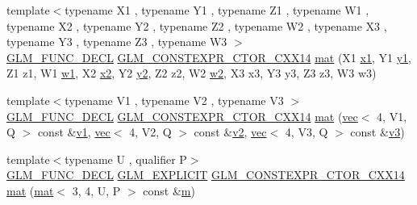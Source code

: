 \begin{DoxyCompactItemize}
{\footnotesize template$<$typename X1 , typename Y1 , typename Z1 , typename W1 , typename X2 , typename Y2 , typename Z2 , typename W2 , typename X3 , typename Y3 , typename Z3 , typename W3 $>$ }\\\mbox{\hyperlink{setup_8hpp_ab2d052de21a70539923e9bcbf6e83a51}{G\+L\+M\+\_\+\+F\+U\+N\+C\+\_\+\+D\+E\+CL}} \mbox{\hyperlink{setup_8hpp_a0900f9145e68bf6061b6f5e7be3fa751}{G\+L\+M\+\_\+\+C\+O\+N\+S\+T\+E\+X\+P\+R\+\_\+\+C\+T\+O\+R\+\_\+\+C\+X\+X14}} \mbox{\hyperlink{structglm_1_1mat_3_013_00_014_00_01_t_00_01_q_01_4_a789aeb16a52b123e18e519b41ecfc4f3}{mat}} (X1 \mbox{\hyperlink{_s_d_l__opengl__glext_8h_a49825216c96caaeb09237b36651181c5}{x1}}, Y1 \mbox{\hyperlink{_s_d_l__opengl__glext_8h_a3af6c78fcdfccea028a5878bc747ef39}{y1}}, Z1 z1, W1 \mbox{\hyperlink{_s_d_l__opengl__glext_8h_ab5b747bf5adb1f9134337c30b9a4ce84}{w1}}, X2 \mbox{\hyperlink{_s_d_l__opengl__glext_8h_a7b907a03236685c534d89d604cff23c8}{x2}}, Y2 \mbox{\hyperlink{_s_d_l__opengl__glext_8h_a2be1135ed68e8d80fa9e130c7814f8c2}{y2}}, Z2 z2, W2 \mbox{\hyperlink{_s_d_l__opengl__glext_8h_a1ca5aca787be24213d9591fdf074b094}{w2}}, X3 x3, Y3 y3, Z3 z3, W3 w3)
\item 
{\footnotesize template$<$typename V1 , typename V2 , typename V3 $>$ }\\\mbox{\hyperlink{setup_8hpp_ab2d052de21a70539923e9bcbf6e83a51}{G\+L\+M\+\_\+\+F\+U\+N\+C\+\_\+\+D\+E\+CL}} \mbox{\hyperlink{setup_8hpp_a0900f9145e68bf6061b6f5e7be3fa751}{G\+L\+M\+\_\+\+C\+O\+N\+S\+T\+E\+X\+P\+R\+\_\+\+C\+T\+O\+R\+\_\+\+C\+X\+X14}} \mbox{\hyperlink{structglm_1_1mat_3_013_00_014_00_01_t_00_01_q_01_4_a135092220b6453ee15896a05b01fcbd6}{mat}} (\mbox{\hyperlink{structglm_1_1vec}{vec}}$<$ 4, V1, Q $>$ const \&\mbox{\hyperlink{_s_d_l__opengl__glext_8h_a435c176a02c061b43e19bdf7c86cceae}{v1}}, \mbox{\hyperlink{structglm_1_1vec}{vec}}$<$ 4, V2, Q $>$ const \&\mbox{\hyperlink{_s_d_l__opengl__glext_8h_a0928f6d0f0f794ba000a21dfae422136}{v2}}, \mbox{\hyperlink{structglm_1_1vec}{vec}}$<$ 4, V3, Q $>$ const \&\mbox{\hyperlink{_s_d_l__opengl__glext_8h_acc806b31cbf466ceba6555983d8b814d}{v3}})
\item 
{\footnotesize template$<$typename U , qualifier P$>$ }\\\mbox{\hyperlink{setup_8hpp_ab2d052de21a70539923e9bcbf6e83a51}{G\+L\+M\+\_\+\+F\+U\+N\+C\+\_\+\+D\+E\+CL}} \mbox{\hyperlink{setup_8hpp_a6c74f5a5e7b134ab69023ff9a30d4d5d}{G\+L\+M\+\_\+\+E\+X\+P\+L\+I\+C\+IT}} \mbox{\hyperlink{setup_8hpp_a0900f9145e68bf6061b6f5e7be3fa751}{G\+L\+M\+\_\+\+C\+O\+N\+S\+T\+E\+X\+P\+R\+\_\+\+C\+T\+O\+R\+\_\+\+C\+X\+X14}} \mbox{\hyperlink{structglm_1_1mat_3_013_00_014_00_01_t_00_01_q_01_4_ab07fea76c961a22e1aa486f9276f2d75}{mat}} (\mbox{\hyperlink{structglm_1_1mat}{mat}}$<$ 3, 4, U, P $>$ const \&\mbox{\hyperlink{_s_d_l__opengl__glext_8h_af593500c283bf1a787a6f947f503a5c2}{m}})

\end{DoxyCompactItemize}

